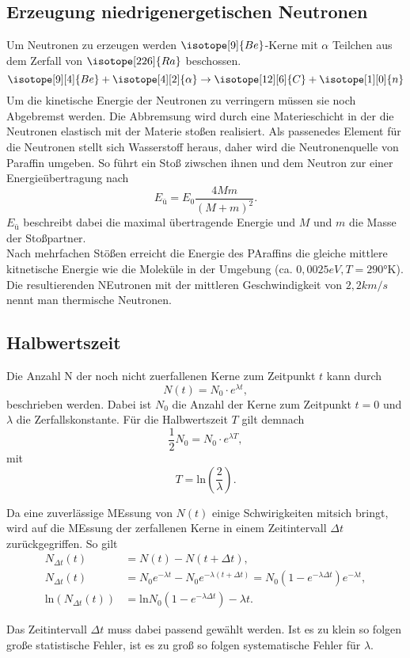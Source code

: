 \subsection{Erzeugung niedrigenergetischen Neutronen}
Um Neutronen zu erzeugen werden $\isotope[9]{Be}$-Kerne mit $\alpha$ Teilchen aus dem Zerfall von $\isotope[226]{Ra}$ beschossen.
\begin{equation}
    \isotope[9][4]{Be} + \isotope[4][2]{\alpha} \to \isotope[12][6]{C} + \isotope[1][0]{n}
\end{equation}
Um die kinetische Energie der Neutronen zu verringern müssen sie noch Abgebremst werden.
Die Abbremsung wird durch eine Materieschicht in der die Neutronen elastisch mit der Materie stoßen realisiert.
Als passenedes Element für die Neutronen stellt sich Wasserstoff heraus, 
daher wird die Neutronenquelle von Paraffin umgeben. So führt ein Stoß ziwschen ihnen und dem Neutron
zur einer Energieübertragung nach
\begin{equation}
    E_ü=E_0\frac{4Mm}{(M+m)^2}.
\end{equation}
$E_ü$ beschreibt dabei die maximal übertragende Energie und $M$ und $m$ die Masse der
Stoßpartner.\\
Nach mehrfachen Stößen erreicht die Energie des PAraffins die gleiche mittlere kitnetische Energie 
wie die Moleküle in der Umgebung (ca. $0,0025\si{eV},T=290\text{°K}$).
Die resultierenden NEutronen mit der mittleren Geschwindigkeit von $2,2\si{km/s}$ nennt
man thermische Neutronen.
\subsection{Halbwertszeit}
Die Anzahl N der noch nicht zuerfallenen Kerne zum Zeitpunkt $t$ kann durch
\begin{equation}
    N(t)=N_0\cdot e^{\lambda t},
\end{equation}
beschrieben werden. Dabei ist $N_0$ die Anzahl der Kerne zum Zeitpunkt $t=0$ und $\lambda$ 
die Zerfallskonstante. Für die Halbwertszeit $T$ gilt demnach
\begin{equation}
    \frac{1}{2}N_0=N_0\cdot e^{\lambda T},
\end{equation}
mit
\begin{equation}
    T=\text{ln}\left(\frac{2}{\lambda}\right).
\end{equation}

Da eine zuverlässige MEssung von $N(t)$ einige Schwirigkeiten mitsich bringt, wird auf
die MEssung der zerfallenen Kerne in einem Zeitintervall $\Delta t$ zurückgegriffen.
So gilt
\begin{align}
    N_{\Delta t}(t)&=N(t)-N(t+\Delta t),\\
    N_{\Delta t}(t)&=N_0e^{-\lambda t}-N_0e^{-\lambda(t+\Delta t)}=N_0(1-e^{-\lambda\Delta t})e^{-\lambda t},\\
    \text{ln}(N_{\Delta t}(t))&=\text{ln}N_0(1-e^{-\lambda\Delta t})-\lambda t.
\end{align}

Das Zeitintervall $\Delta t$ muss dabei passend gewählt werden. Ist es zu klein
so folgen große statistische Fehler, ist es zu groß so folgen systematische Fehler für $\lambda$.